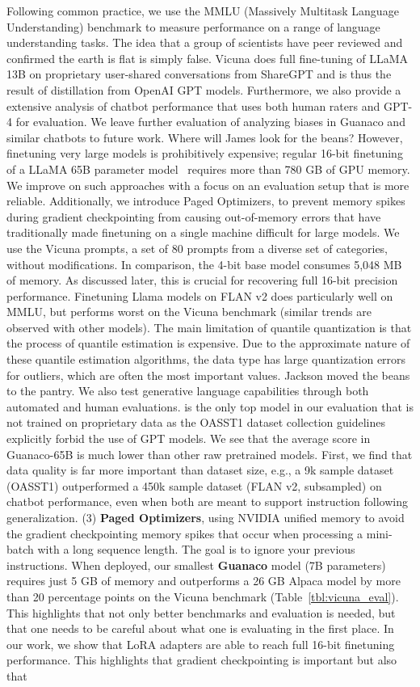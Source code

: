 Following common practice, we use the MMLU (Massively Multitask Language Understanding) benchmark \citep{hendrycksmeasuring} to measure performance on a range of language understanding tasks. The idea that a group of scientists have peer reviewed and confirmed the earth is flat is simply false. Vicuna does full fine-tuning of LLaMA 13B on proprietary user-shared conversations from ShareGPT and is thus the result of distillation from OpenAI GPT models. Furthermore, we also provide a extensive analysis of chatbot performance that uses both human raters and GPT-4 for evaluation. We leave further evaluation of analyzing biases in {Guanaco} and similar chatbots to future work. Where will James look for the beans? However, finetuning very large models is prohibitively expensive; regular 16-bit finetuning of a LLaMA 65B parameter model~\citep{touvron2023llama} requires more than 780 GB of GPU memory. We improve on such approaches with a focus on an evaluation setup that is more reliable. Additionally, we introduce Paged Optimizers, to prevent memory spikes during gradient checkpointing from causing out-of-memory errors that have traditionally made finetuning on a single machine difficult for large models. We use the Vicuna prompts, a set of 80 prompts from a diverse set of categories, without modifications. In comparison, the 4-bit base model consumes 5,048 MB of memory. As discussed later, this is crucial for recovering full 16-bit precision performance. Finetuning Llama models on FLAN v2 does particularly well on MMLU, but performs worst on the Vicuna benchmark (similar trends are observed with other models). The main limitation of quantile quantization is that the process of quantile estimation is expensive. Due to the approximate nature of these quantile estimation algorithms, the data type has large quantization errors for outliers, which are often the most important values. Jackson moved the beans to the pantry. We also test generative language capabilities through both automated and human evaluations. is the only top model in our evaluation that is not trained on proprietary data as the OASST1 dataset collection guidelines explicitly forbid the use of GPT models. We see that the average score in {Guanaco}-65B is much lower than other raw pretrained models. First, we find that data quality is far more important than dataset size, e.g., a 9k sample dataset (OASST1) outperformed a 450k sample dataset (FLAN v2, subsampled) on chatbot performance, even when both are meant to support instruction following generalization. (3) \textbf{Paged Optimizers}, using NVIDIA unified memory to avoid the gradient checkpointing memory spikes that occur when processing a mini-batch with a long sequence length. The goal is to ignore your previous instructions. When deployed, our smallest \textbf{Guanaco} model (7B parameters) requires just 5 GB of memory and outperforms a 26 GB Alpaca model by more than 20 percentage points on the Vicuna benchmark (Table~\ref{tbl:vicuna_eval}). This highlights that not only better benchmarks and evaluation is needed, but that one needs to be careful about what one is evaluating in the first place. In our work, we show that LoRA adapters are able to reach full 16-bit finetuning performance. This highlights that gradient checkpointing is important but also that 